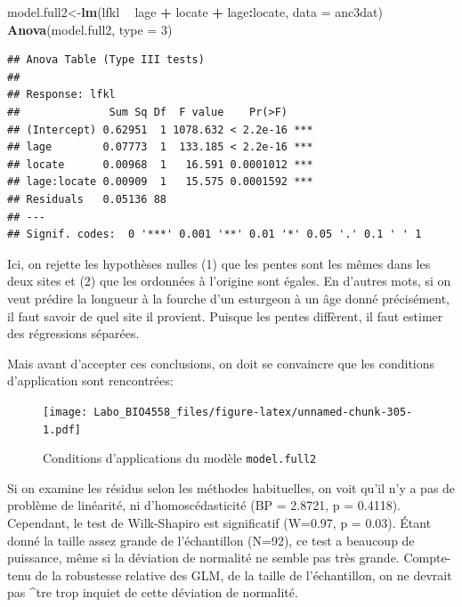 \documentclass[12pt,]{book}
\newenvironment{Shaded}{\begin{snugshade}}{\end{snugshade}}
\newcommand{\DataTypeTok}[1]{\textcolor[rgb]{0.13,0.29,0.53}{#1}}
\newcommand{\DecValTok}[1]{\textcolor[rgb]{0.00,0.00,0.81}{#1}}
\newcommand{\KeywordTok}[1]{\textcolor[rgb]{0.13,0.29,0.53}{\textbf{#1}}}
\newcommand{\NormalTok}[1]{#1}
\newcommand{\OperatorTok}[1]{\textcolor[rgb]{0.81,0.36,0.00}{\textbf{#1}}}
\newcommand{\StringTok}[1]{\textcolor[rgb]{0.31,0.60,0.02}{#1}}
\begin{document}
\begin{Shaded}
\begin{Highlighting}[]
\NormalTok{model.full2<-}\KeywordTok{lm}\NormalTok{(lfkl }\OperatorTok{~}\StringTok{ }\NormalTok{lage }\OperatorTok{+}\StringTok{ }\NormalTok{locate }\OperatorTok{+}\StringTok{ }\NormalTok{lage}\OperatorTok{:}\NormalTok{locate, }\DataTypeTok{data =}\NormalTok{ anc3dat)}
\KeywordTok{Anova}\NormalTok{(model.full2, }\DataTypeTok{type =} \DecValTok{3}\NormalTok{)}
\end{Highlighting}
\end{Shaded}

\begin{verbatim}
## Anova Table (Type III tests)
## 
## Response: lfkl
##              Sum Sq Df  F value    Pr(>F)    
## (Intercept) 0.62951  1 1078.632 < 2.2e-16 ***
## lage        0.07773  1  133.185 < 2.2e-16 ***
## locate      0.00968  1   16.591 0.0001012 ***
## lage:locate 0.00909  1   15.575 0.0001592 ***
## Residuals   0.05136 88                       
## ---
## Signif. codes:  0 '***' 0.001 '**' 0.01 '*' 0.05 '.' 0.1 ' ' 1
\end{verbatim}

Ici, on rejette les hypothèses nulles (1) que les pentes sont les mêmes dans les deux sites et (2) que les ordonnées à l'origine sont égales. En d'autres mots, si on veut prédire la longueur à la fourche d'un esturgeon à un âge donné précisément, il faut savoir de quel site il provient. Puisque les pentes diffèrent, il faut estimer des régressions séparées.

Mais avant d'accepter ces conclusions, on doit se convaincre que les conditions d'application sont rencontrées:

\begin{figure}
\centering
\texttt{[image: Labo\_BIO4558\_files/figure-latex/unnamed-chunk-305-1.pdf]}
\caption{\label{fig:unnamed-chunk-305}Conditions d'applications du modèle \texttt{model.full2}}
\end{figure}

Si on examine les résidus selon les méthodes habituelles, on voit qu'il n'y a pas de problème de linéarité, ni d'homoscédasticité (BP = 2.8721, p = 0.4118). Cependant, le test de Wilk-Shapiro est significatif (W=0.97, p = 0.03). Étant donné la taille assez grande de l'échantillon (N=92), ce test a beaucoup de puissance, même si la déviation de normalité ne semble pas très grande. Compte-tenu de la robustesse relative des GLM, de la taille de l'échantillon, on ne devrait pas \^{}tre trop inquiet de cette déviation de normalité.
\end{document}
